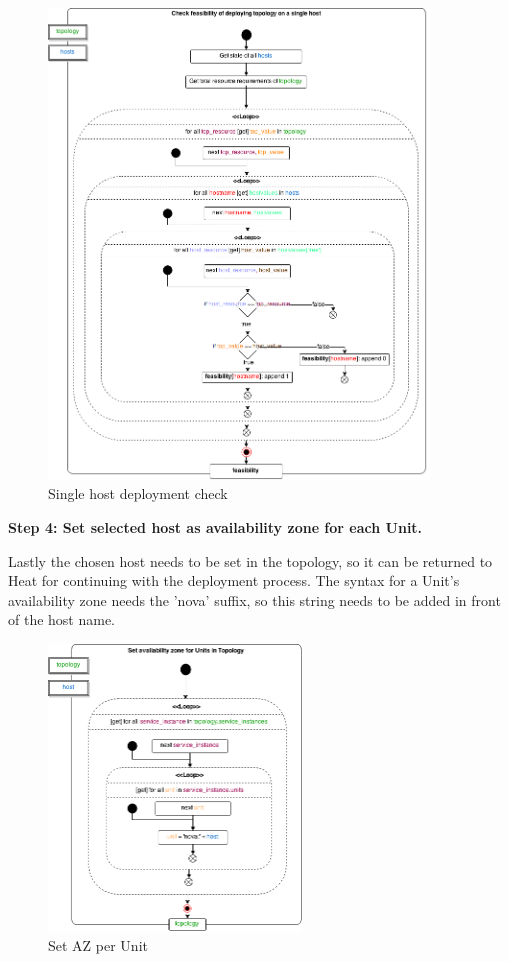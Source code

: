 \begin{figure}[H]
\centering

\includegraphics[width=0.9\textwidth]{images/implementation/cm_single_host_check}

\caption{Single host deployment check}
\end{figure}
\newpage

\textbf{Step 4: Set selected host as availability zone for each Unit.}

Lastly the chosen host needs to be set in the topology, so it can be returned to Heat for continuing with the deployment process. The syntax for a Unit's availability zone needs the 'nova' suffix, so this string needs to be added in front of the host name.

\begin{figure}[H]
\centering

\includegraphics[width=0.6\textwidth]{images/implementation/cm_set_az_topology}

\caption{Set AZ per Unit}
\end{figure}

